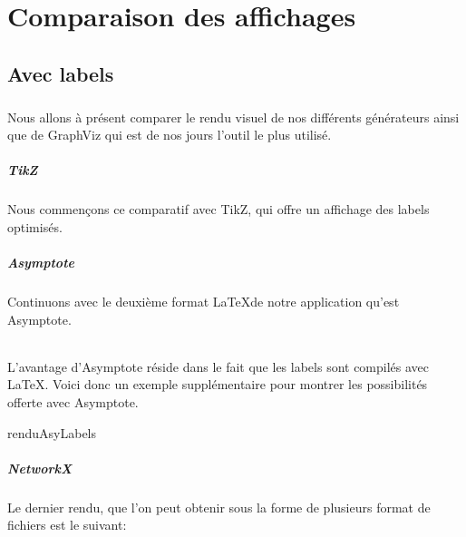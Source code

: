 \chapter{Comparaison des affichages}

	\section{Avec labels}
	
\paragraph{}Nous allons à présent comparer le rendu visuel de nos différents générateurs ainsi que de GraphViz qui est de nos jours l'outil le plus utilisé.

\paragraph{TikZ} Nous commençons ce comparatif avec TikZ, qui offre un affichage des labels optimisés.\\

\begin{center}
\resizebox {!}{7cm} {
}
\end{center}

\paragraph{Asymptote} Continuons avec le deuxième format \LaTeX de notre application qu'est Asymptote.\\

\begin{center}

\end{center}

\subparagraph{} L'avantage d'Asymptote réside dans le fait que les labels sont compilés avec \LaTeX. Voici donc un exemple supplémentaire pour montrer les possibilités offerte avec Asymptote.\\

\begin{center}
 {renduAsyLabels}
\end{center}

\paragraph{NetworkX} Le dernier rendu, que l'on peut obtenir sous la forme de plusieurs format de fichiers est le suivant:\\

